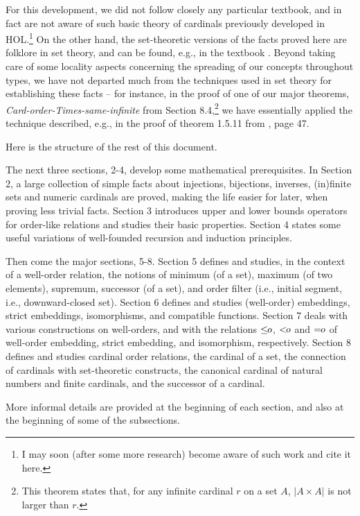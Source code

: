 For this development, we did not follow closely any particular textbook, and in fact are not 
aware of such basic theory of cardinals previously developed in HOL.\footnote{I may soon 
(after some more research) become aware of such work and cite it here.} On 
the other hand, 
the set-theoretic versions of the facts proved here are folklore in set theory, and can be found, 
e.g., in the textbook \cite{card-book}.  Beyond taking care of some locality aspects 
concerning the spreading of our concepts throughout types, we have not departed  
much from the techniques used in set theory for establishing these facts -- for instance, 
in the proof of one of our major theorems, 
\textit{Card-order-Times-same-infinite} from Section 8.4,\footnote{This theorem states that, for any  
infinite cardinal $r$ on a set $A$, $|A\times A|$ is not larger than $r$.}  
we have essentially applied the technique described, e.g., in the proof of 
theorem 1.5.11 from \cite{card-book}, page 47.   

Here is the structure of the rest of this document.  

The next three sections, 2-4, develop some  
mathematical prerequisites. 
In Section 2, a large collection of simple facts about 
injections, bijections, inverses, (in)finite sets and numeric cardinals are proved, 
making the life easier 
for later, when proving less trivial facts.  
Section 3 introduces upper and lower 
bounds operators for order-like relations and studies their basic properties.  
Section 4 states some useful variations of well-founded recursion and induction principles.   

Then come the major sections, 5-8. 
Section 5 defines and studies, in the context of a well-order relation, 
the notions of minimum (of a set), maximum (of two elements), supremum, successor (of a set), 
and order filter (i.e., initial segment, i.e., downward-closed set).  
Section 6 defines and studies (well-order) embeddings, strict embeddings, isomorphisms, and 
compatible functions.  
Section 7 deals with various constructions on well-orders, and with the relations 
$\mbox{$\leq\!\!o$}$, $\mbox{$<\!\!o$}$ and $\mbox{$=\!\!o$}$ of well-order embedding, strict embedding, and isomorphism, respectively.  
Section 8 defines and studies cardinal order relations, the cardinal of a set, the connection 
of cardinals with set-theoretic constructs, 
the canonical cardinal of natural numbers and finite cardinals,  and the successor 
of a cardinal.   

More informal details are provided at the beginning of each section, and also at the 
beginning of some of the subsections.  









